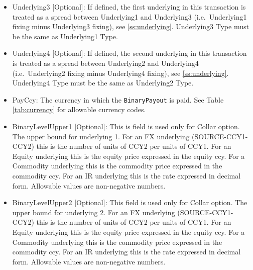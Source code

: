 \begin{itemize}
\item Underlying3 [Optional]: If defined, the first underlying in this transaction is treated as a spread between Underlying1 and Underlying3 (i.e.\ Underlying1 fixing minus Underlying3 fixing), see \ref{ss:underlying}. Underlying3 Type must be the same as Underlying1 Type.
\item Underlying4 [Optional]: If defined, the second underlying in this transaction is treated as a spread between Underlying2 and Underlying4 (i.e.\ Underlying2 fixing minus Underlying4 fixing), see \ref{ss:underlying}. Underlying4 Type must be the same as Underlying2 Type.
\item PayCcy: The currency in which the \verb+BinaryPayout+ is paid.  See Table \ref{tab:currency} for allowable currency codes.
\item BinaryLevelUpper1 [Optional]: This is field is used only for Collar option. The upper bound for underlying 1. For an FX underlying (SOURCE-CCY1-CCY2) this is the number of units of
  CCY2 per units of CCY1. For an Equity underlying this is the equity price expressed in the equity ccy.  For a Commodity underlying this is the commodity price expressed in the commodity ccy. For an IR underlying this is the rate expressed in decimal form. Allowable values
  are non-negative numbers.
\item BinaryLevelUpper2 [Optional]: This field is used only for Collar option. The upper bound for underlying 2. For an FX underlying (SOURCE-CCY1-CCY2) this is the number of units of
  CCY2 per units of CCY1. For an Equity underlying this is the equity price expressed in the equity ccy.  For a Commodity underlying this is the commodity price expressed in the commodity ccy. For an IR underlying this is the rate expressed in decimal form. Allowable values
  are non-negative numbers.

\end{itemize}
